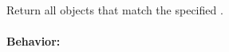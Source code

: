 Return all objects that match the specified .

\paragraph{Behavior:}
\begin{itemize}[noitemsep]


\end{itemize}
